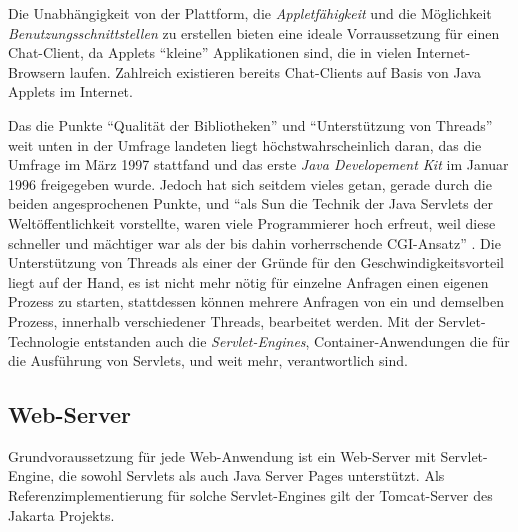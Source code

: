 Die Unabh\"angigkeit von der Plattform, die {\it Appletf\"ahigkeit} und die M\"oglichkeit {\it Benutzungsschnittstellen}
zu erstellen bieten eine ideale Vorraussetzung f\"ur einen Chat-Client, da Applets ``kleine'' Applikationen
sind, die in vielen Internet-Browsern laufen. Zahlreich existieren bereits Chat-Clients auf Basis von Java Applets
im Internet. 

Das die Punkte ``Qualit\"at der Bibliotheken'' und ``Unterst\"utzung von Threads'' weit unten in der
Umfrage landeten liegt h\"ochstwahrscheinlich daran, das die Umfrage im M\"arz 1997 stattfand
und das erste {\it Java Developement Kit} im Januar 1996 freigegeben wurde. Jedoch hat sich seitdem
vieles getan, gerade durch die beiden angesprochenen Punkte, und ``als Sun die Technik der Java Servlets
der Welt\"offentlichkeit vorstellte, waren viele Programmierer hoch erfreut, weil diese schneller und
m\"achtiger war als der bis dahin vorherrschende CGI-Ansatz'' \cite[S.~48]{oeztuerk_02}. Die Unterst\"utzung
von Threads als einer der Gr\"unde f\"ur den Geschwindigkeitsvorteil liegt auf der Hand, es ist nicht mehr n\"otig
f\"ur einzelne Anfragen einen eigenen Prozess zu starten, stattdessen k\"onnen mehrere Anfragen von ein
und demselben Prozess, innerhalb verschiedener Threads, bearbeitet werden. Mit der Servlet-Technologie
entstanden auch die {\it Servlet-Engines}, Container-Anwendungen die f\"ur die Ausf\"uhrung von
Servlets, und weit mehr, verantwortlich sind. 


\subsection{\label{sec:webserver}Web-Server}
Grundvoraussetzung f\"ur jede Web-Anwendung ist ein Web-Server mit Servlet-Engine, die sowohl Servlets
als auch Java Server Pages unterst\"utzt. Als Referenzimplementierung f\"ur solche Servlet-Engines
gilt der Tomcat-Server des Jakarta Projekts\footnotemark[1].

